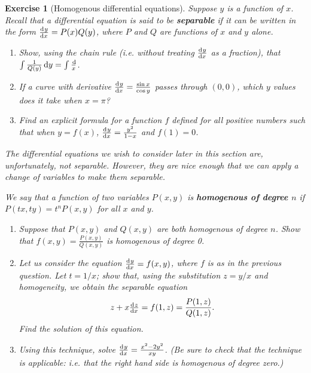 \documentclass[a4paper,leqno,9pt]{article}
\theoremstyle{exercise}
\newtheorem{Exercise}{Exercise}
\newenvironment{exercise}
  {\begin{mdframed}\begin{Exercise}}
  {\end{Exercise}\end{mdframed}}
\theoremstyle{plain}
\theoremstyle{definition}
\theoremstyle{remark}
\newcommand{\df}{\textbf}
\begin{document}
\begin{exercise}[Homogenous differential equations]
  Suppose $ y $ is a function of $ x $. Recall that a differential equation is said to be \df{separable} if it can
  be written in the form $ \od{y}{x} = P(x) Q(y) $, where $ P $ and $ Q $ are functions of $ x $ and $ y $ alone.
  \begin{enumerate}
    \item Show, using the chain rule (i.e. without treating $ \od{y}{x} $ as a fraction), that $ \int \frac{1}{Q(y)} \dif{y} = \int \frac \dif{x} $.
    \item If a curve with derivative $ \od{y}{x} = \frac{\sin x}{\cos y} $ passes through $ (0,0) $, which $ y $ values does it take when $ x = \pi $?
    \item Find an explicit formula for a function $ f $ defined for all positive numbers such that when $ y = f(x) $,
          $ \od{y}{x} = \frac{y^2}{1 - x} $ and $ f(1) = 0 $.
  \end{enumerate}

  The differential equations we wish to consider later in this section are, unfortunately, \emph{not} separable. However,
  they are nice enough that we can apply a change of variables to \emph{make} them separable.

  We say that a function of two variables $ P(x,y) $ is \df{homogenous of degree $ n $} if $ P(tx, ty) = t^nP(x,y) $ for all $ x $ and $ y $.
  \begin{enumerate}[resume]
    \item Suppose that $ P(x,y) $ and $ Q(x,y) $ are both homogenous of degree $ n $. Show that $ f(x,y) = \frac{P(x,y)}{Q(x,y)} $ is
          homogenous of degree 0.
    \item Let us consider the equation $ \od{y}{x} = f(x,y) $, where $ f $ is as in the previous question. Let $ t = 1/x $;
          show that, using the substitution $ z = y/x $ and homogeneity, we obtain the separable equation
          \begin{displaymath}
            z + x\od{z}{x} = f(1,z) = \frac{P(1,z)}{Q(1,z)}.
          \end{displaymath}
          Find the solution of this equation.
    \item Using this technique, solve $ \od{y}{x} = \frac{x^2 - 2y^2}{xy} $. (Be sure to check that the technique is applicable: i.e. that
          the right hand side is homogenous of degree zero.)
  \end{enumerate}
\end{exercise}
\end{document}
